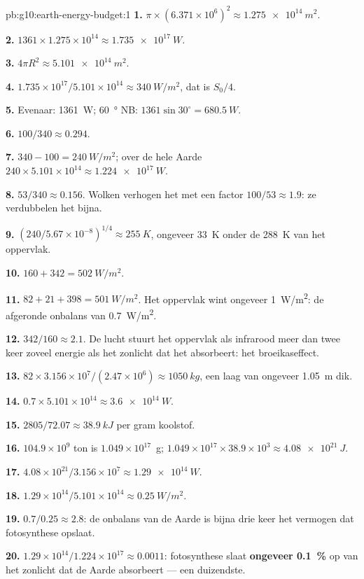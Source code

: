 \begin{solution}{pb:g10:earth-energy-budget:1}
\textbf{1.} $\pi \times (6.371\times10^6)^2 \approx \qty{1.275e14}{m^2}$.

\textbf{2.} $1361 \times 1.275\times10^{14} \approx \qty{1.735e17}{W}$.

\textbf{3.} $4\pi R^2 \approx \qty{5.101e14}{m^2}$.

\textbf{4.} $1.735\times10^{17}/5.101\times10^{14} \approx \qty{340}{W/m^2}$,
dat is $S_0/4$.

\textbf{5.} Evenaar: \qty{1361}{W}; \qty{60}{\degree} NB: $1361 \sin
30^\circ = \qty{680.5}{W}$.

\textbf{6.} $100/340 \approx 0.294$.

\textbf{7.} $340 - 100 = \qty{240}{W/m^2}$; over de hele Aarde $240 \times
5.101\times10^{14} \approx \qty{1.224e17}{W}$.

\textbf{8.} $53/340 \approx 0.156$. Wolken verhogen het  met een factor
$100/53 \approx 1.9$: ze verdubbelen het bijna.

\textbf{9.} $(240/5.67\times10^{-8})^{1/4} \approx \qty{255}{K}$, ongeveer
\qty{33}{K} onder de \qty{288}{K} van het oppervlak.

\textbf{10.} $160 + 342 = \qty{502}{W/m^2}$.

\textbf{11.} $82 + 21 + 398 = \qty{501}{W/m^2}$. Het oppervlak wint ongeveer
\qty{1}{W/m^2}: de afgeronde onbalans van \qty{0.7}{W/m^2}.

\textbf{12.} $342/160 \approx 2.1$. De lucht stuurt het oppervlak als infrarood
meer dan twee keer zoveel energie als het zonlicht dat het absorbeert: het
broeikaseffect.

\textbf{13.} $82 \times 3.156\times10^7/(2.47\times10^6) \approx
\qty{1050}{kg}$, een laag van ongeveer \qty{1.05}{m} dik.

\textbf{14.} $0.7 \times 5.101\times10^{14} \approx \qty{3.6e14}{W}$.

\textbf{15.} $2805/72.07 \approx \qty{38.9}{kJ}$ per gram koolstof.

\textbf{16.} $104.9\times10^9$ ton is $1.049\times10^{17}$~g;
$1.049\times10^{17} \times 38.9\times10^3 \approx \qty{4.08e21}{J}$.

\textbf{17.} $4.08\times10^{21}/3.156\times10^7 \approx \qty{1.29e14}{W}$.

\textbf{18.} $1.29\times10^{14}/5.101\times10^{14} \approx
\qty{0.25}{W/m^2}$.

\textbf{19.} $0.7/0.25 \approx 2.8$: de onbalans van de Aarde is bijna drie
keer het vermogen dat fotosynthese opslaat.

\textbf{20.} $1.29\times10^{14}/1.224\times10^{17} \approx 0.0011$:
fotosynthese slaat \textbf{ongeveer \qty{0.1}{\percent}} op van het zonlicht
dat de Aarde absorbeert --- een duizendste.
\end{solution}
